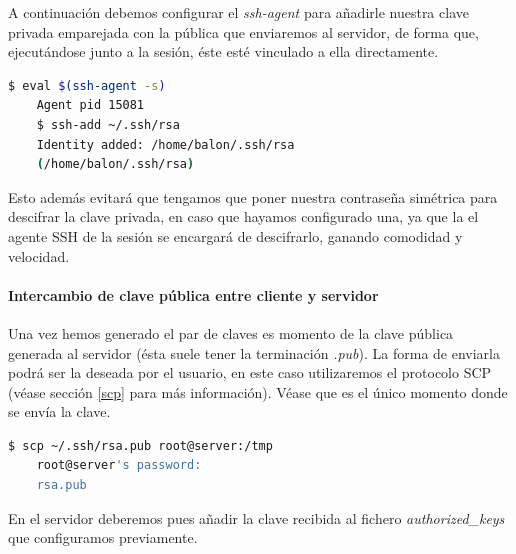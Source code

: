 \documentclass[a4paper, 11pt, titlepage]{article}
\begin{document}
        A continuación debemos configurar el \textit{ssh-agent} para añadirle nuestra 
        clave privada emparejada con la pública que enviaremos al servidor, de forma que,
        ejecutándose junto a la sesión, éste esté vinculado a ella directamente.

        \begin{lstlisting}[language=bash,basicstyle=\small]
    $ eval $(ssh-agent -s)
    Agent pid 15081
    $ ssh-add ~/.ssh/rsa
    Identity added: /home/balon/.ssh/rsa 
    (/home/balon/.ssh/rsa) \end{lstlisting}

        Esto además evitará que tengamos que poner nuestra contraseña simétrica 
        para descifrar la clave privada, en caso que hayamos configurado una, ya que la 
        el agente SSH de la sesión se encargará de descifrarlo, ganando comodidad y velocidad.

        \paragraph{Intercambio de clave pública entre cliente y servidor} Una vez hemos 
        generado el par de claves es momento de la clave pública generada al servidor 
        (ésta suele tener la terminación \textit{.pub}). La forma de enviarla podrá ser 
        la deseada por el usuario, en este caso utilizaremos el protocolo SCP (véase 
        sección \ref{scp} para más información). Véase que es el único momento donde se 
        envía la clave.
        
        \begin{lstlisting}[language=bash]
    $ scp ~/.ssh/rsa.pub root@server:/tmp
    root@server's password:
    rsa.pub \end{lstlisting}

        En el servidor deberemos pues añadir la clave recibida al fichero \textit{authorized\_keys}
        que configuramos previamente.
        
\end{document}
